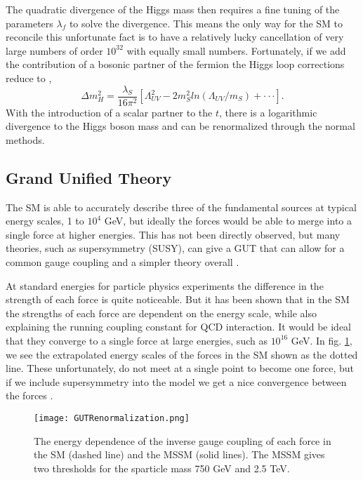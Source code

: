 The quadratic divergence of the Higgs mass then requires a fine tuning of the parameters $\lambda_f$ to solve the divergence. This means the only way for the SM to reconcile this unfortunate fact is to have a relatively lucky cancellation of very large numbers of order $10^{32}$ with equally small numbers. Fortunately, if we add the contribution of a bosonic partner of the fermion the Higgs loop corrections reduce to \cite{martin_supersymmetry_1997},
\begin{equation}
\Delta m_{H}^{2}=\frac{\lambda_{S}}{16\pi^{2}}[\Lambda_{UV}^{2} - 2m_{S}^{2}ln(\Lambda_{UV}/m_{S})+\cdot\cdot\cdot].
\label{HiggsRenormalization}
\end{equation}
With the introduction of a scalar partner to the $t$, there is a logarithmic divergence to the Higgs boson mass and can be renormalized through the normal methods.

\subsection{Grand Unified Theory}

The SM is able to accurately describe three of the fundamental sources at typical energy scales, 1 to $10^{4}$ GeV, but ideally the forces would be able to merge into a single force at higher energies. This has not been directly observed, but many theories, such as supersymmetry (SUSY), can give a GUT that can allow for a common gauge coupling and a simpler theory overall \cite{martin_supersymmetry_1997}.

At standard energies for particle physics experiments the difference in the strength of each force is quite noticeable. But it has been shown that in the SM the strengths of each force are dependent on the energy scale, while also explaining the running coupling constant for QCD interaction. It would be ideal that they converge to a single force at large energies, such as $10^{16}$ GeV. In fig. \ref{GUT}, we see the extrapolated energy scales of the forces in the SM shown as the dotted line. These unfortunately, do not meet at a single point to become one force, but if we include supersymmetry into the model we get a nice convergence between the forces \cite{martin_supersymmetry_1997}.

\begin{figure}
 	\centering
	\texttt{[image: GUTRenormalization.png]}
 	\caption[GUT Force Energy Dependence]{The energy dependence of the inverse gauge coupling of each force in the SM (dashed line) and the MSSM (solid lines). The MSSM gives two thresholds for the sparticle mass 750 GeV and 2.5 TeV.}
 	\label{GUT} 
\end{figure}

